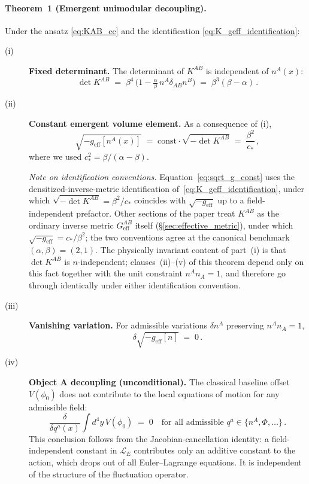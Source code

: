\paragraph{Theorem~1 (Emergent unimodular decoupling).}
\label{thm:cc_decoupling}%
Under the ansatz \eqref{eq:KAB_cc} and the identification
\eqref{eq:K_geff_identification}:
\begin{description}
\item[(i)] \textbf{Fixed determinant.} The determinant of $K^{AB}$ is
independent of $n^A(x)$:
\begin{equation}
\det K^{AB} \;=\; \beta^4\,\Big(1 - \tfrac{\alpha}{\beta}\,n^A
\delta_{AB} n^B\Big) \;=\; \beta^3(\beta - \alpha)\,.
\label{eq:detK}
\end{equation}

\item[(ii)] \textbf{Constant emergent volume element.} As a consequence
of (i),
\begin{equation}
\sqrt{-g_{\mathrm{eff}}[n^A(x)]} \;=\;
\mathrm{const}\cdot \sqrt{-\det K^{AB}} \;=\;
\frac{\beta^2}{c_*}\,,
\label{eq:sqrt_g_const}
\end{equation}
where we used $c_*^2 = \beta/(\alpha-\beta)$.

\noindent
\textit{Note on identification conventions.}
Equation~\eqref{eq:sqrt_g_const} uses the densitized-inverse-metric
identification of~\eqref{eq:K_geff_identification}, under which
$\sqrt{-\det K^{AB}}=\beta^2/c_*$ coincides with
$\sqrt{-g_{\mathrm{eff}}}$ up to a field-independent prefactor.
Other sections of the paper treat $K^{AB}$ as the ordinary inverse
metric $G^{AB}_{\mathrm{eff}}$ itself (\S\ref{sec:effective_metric}),
under which $\sqrt{-g_{\mathrm{eff}}}=c_*/\beta^2$; the two conventions
agree at the canonical benchmark $(\alpha,\beta)=(2,1)$.
The physically invariant content of part~(i) is that $\det K^{AB}$
is $n$-independent; clauses~(ii)--(v) of this theorem depend only on
this fact together with the unit constraint $n^A n_A=1$, and therefore
go through identically under either identification convention.

\item[(iii)] \textbf{Vanishing variation.} For admissible variations
$\delta n^A$ preserving $n^A n_A = 1$,
\begin{equation}
\delta \sqrt{-g_{\mathrm{eff}}[n]} \;=\; 0\,.
\label{eq:delta_sqrt_g}
\end{equation}
\item[(iv)] \textbf{Object A decoupling (unconditional).}
The classical baseline offset $V(\phi_0)$ does not contribute to the
local equations of motion for any admissible field:
\begin{equation}
\frac{\delta}{\delta q^a(x)}
\int d^4 y \, V(\phi_0) \;=\; 0
\quad \text{for all admissible } q^a \in \{n^A,\Phi,\ldots\}\,.
\label{eq:A_decoupling}
\end{equation}
This conclusion follows from the Jacobian-cancellation identity: a
field-independent constant in $\mathcal{L}_E$ contributes only an
additive constant to the action, which drops out of all Euler--Lagrange
equations. It is independent of the structure of the fluctuation
operator.


\end{description}
